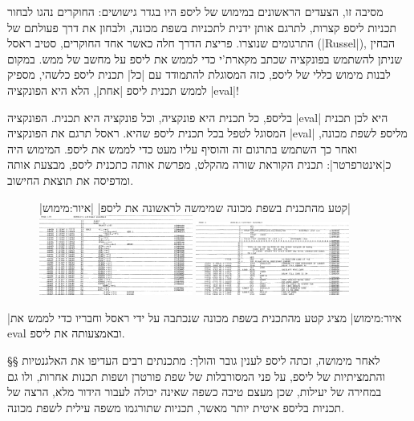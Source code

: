 מסיבה זו, הצעדים הראשונים במימוש של ליספ היו בגדר גישושים: החוקרים נהגו לבחור
תכניות ליספ קצרות, לתרגם אותן ידנית לתכניות בשפת מכונה, ולבחון את דרך פעולתם של
התרגומים שנוצרו. פריצת הדרך חלה כאשר אחד החוקרים, סטיב ראסל (\E|Russel|),
הבחין שניתן להשתמש בפונקציה  שכתב מקארת'י כדי לממש את ליספ על מחשב
של ממש. במקום לבנות מימוש כללי של ליספ, כזה המסוגלת להתמודד עם \ע|כל| תכנית
ליספ כלשהי, מספיק לממש תכנית ליספ \ע|אחת|, הלא היא הפונקציה \E|eval|!

בליספ, כל תכנית היא פונקציה, וכל פונקציה היא תכנית. הפונקציה \E|eval| היא לכן
תכנית המסוגל לטפל בכל תכנית ליספ שהיא. ראסל תרגם את הפונקציה \E|eval| מליספ
לשפת מכונה, ואחר כך השתמש בתרגום זה והוסיף עליו מעט כדי לממש את ליספ. המימוש
היה כ\ע|אינטרפרטר|: תכנית הקוראת שורה מהקלט, מפרשת אותה כתכנית ליספ, מבצעת
אותה ומדפיסה את תוצאת החישוב.

\begin{figure}[H]
|קטע מהתכנית בשפת מכונה שמימשה לראשונה את ליספ|
|איור:מימוש|
\centering
\includegraphics[width=0.45\textwidth]{lisp-assembler2}
\qquad
\includegraphics[width=0.45\textwidth]{lisp-assembler1}
\end{figure}

|איור:מימוש| מציג קטע מהתכנית בשפת מכונה שנכתבה על ידי ראסל וחבריו כדי לממש
את eval ובאמצעותה את ליספ.

§§ 
לאחר מימושה, זכתה ליספ לענין גובר והולך: מתכנתים רבים העדיפו את האלגנטיות
והתמציתיות של ליספ, על פני המסורבלות של שפת פורטרן ושפות תכנות אחרות, ולו גם
במחירה של יעילות, שכן מעצם טיבה כשפה שאינה יכולה לעבור הידור מלא, הרצה של
תכניות בליספ איטית יותר מאשר, תכניות שתורגמו משפה עילית לשפת מכונה.


